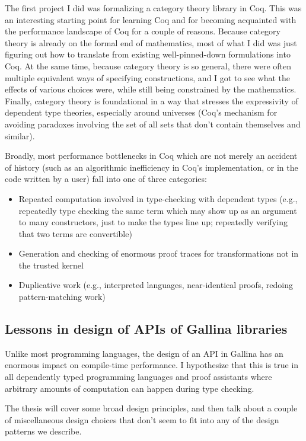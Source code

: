 \documentclass[twoside]{article}
\begin{document}
{The first project I did was formalizing a category theory library in Coq.
This was an interesting starting point for learning Coq and for becoming acquainted with the performance landscape of Coq for a couple of reasons.
Because category theory is already on the formal end of mathematics, most of what I did was just figuring out how to translate from existing well-pinned-down formulations into Coq.
At the same time, because category theory is so general, there were often multiple equivalent ways of specifying constructions, and I got to see what the effects of various choices were, while still being constrained by the mathematics.
Finally, category theory is foundational in a way that stresses the expressivity of dependent type theories, especially around universes (Coq's mechanism for avoiding paradoxes involving the set of all sets that don't contain themselves and similar).

Broadly, most performance bottlenecks in Coq which are not merely an accident of history (such as an algorithmic inefficiency in Coq's implementation, or in the code written by a user) fall into one of three categories:
\begin{itemize}
\item
  Repeated computation involved in type-checking with dependent types (e.g., repeatedly type checking the same term which may show up as an argument to many constructors, just to make the types line up; repeatedly verifying that two terms are convertible)
\item
  Generation and checking of enormous proof traces for transformations not in the trusted kernel
\item
  Duplicative work (e.g., interpreted languages, near-identical proofs, redoing pattern-matching work)
\end{itemize}


\subsection{Lessons in design of APIs of Gallina libraries}

Unlike most programming languages, the design of an API in Gallina has an enormous impact on compile-time performance.
I hypothesize that this is true in all dependently typed programming languages and proof assistants where arbitrary amounts of computation can happen during type checking.

The thesis will cover some broad design principles, and then talk about a couple of miscellaneous design choices that don't seem to fit into any of the design patterns we describe.

}
\end{document}
